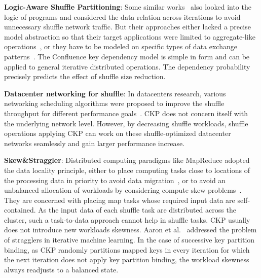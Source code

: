 \documentclass[10pt,journal,compsoc]{IEEEtran}
\begin{document}
\textbf{Logic-Aware Shuffle Partitioning}: 
Some similar works~\cite{zhou2010scope, zhang2012shuffle} also looked
into the logic of programs and considered the data relation across
iterations to avoid unnecessary shuffle network traffic.
But their approaches either lacked a precise model abstraction so that 
their target applications were limited to aggregate-like
operations~\cite{zhang2012shuffle}, or they have to be
modeled on specific types of
data exchange patterns~\cite{zhou2010scope}. The Confluence key
dependency model is simple in form
and can be applied to general iterative distributed operations. 
The dependency probability precisely predicts the effect of 
shuffle size reduction.

\textbf{Datacenter networking for shuffle}: 
In datacenters research, various networking scheduling algorithms were proposed
to improve the shuffle throughput for different performance
goals~\cite{greenberg2009vl2,popa2012faircloud,shieh2011sharing,chowdhury2011managing}.
CKP does not concern itself with the underlying network level. However, by
decreasing shuffle workloads, shuffle operations applying CKP can work
on these shuffle-optimized datacenter networks seamlessly and gain
larger performance increase.


\textbf{Skew\&Straggler}: 
Distributed computing paradigms like MapReduce adopted the data locality
principle, either to place computing tasks close to locations of the
processing data in priority to avoid data
migration~\cite{dean2008mapreduce, zaharia2008improving}, or to avoid an
unbalanced allocation of workloads by considering compute skew
problems~\cite{kwon2010skew, kwon2012skewtune}.
They are concerned with placing map tasks whose required input data
are self-contained.
As the input data of each shuffle task are distributed across the cluster, such a task-to-data approach cannot help in shuffle tasks. 
CKP usually does not introduce new workloads skewness. 
Aaron et al.~\cite{Harlap:2016:ASP} addressed the problem of stragglers in iterative machine learning. 
In the case of successive key partition binding,
as CKP randomly partitions mapped keys in every iteration 
for which the next iteration does not apply key partition binding, 
the workload skewness always readjusts to a balanced state. 

\end{document}
